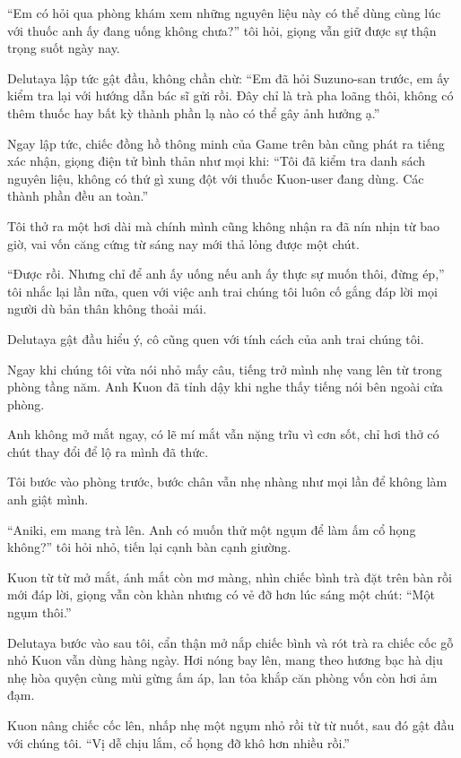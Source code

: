 \documentclass[../main.tex]{subfiles}
\begin{document}
``Em có hỏi qua phòng khám xem những nguyên liệu này có thể dùng cùng lúc với thuốc anh ấy đang uống không chưa?'' tôi hỏi, giọng vẫn giữ được sự thận trọng suốt ngày nay.

Delutaya lập tức gật đầu, không chần chừ: ``Em đã hỏi Suzuno-san trước, em ấy kiểm tra lại với hướng dẫn bác sĩ gửi rồi. Đây chỉ là trà pha loãng thôi, không có thêm thuốc hay bất kỳ thành phần lạ nào có thể gây ảnh hưởng ạ.''

Ngay lập tức, chiếc đồng hồ thông minh của Game trên bàn cũng phát ra tiếng xác nhận, giọng điện tử bình thản như mọi khi: ``Tôi đã kiểm tra danh sách nguyên liệu, không có thứ gì xung đột với thuốc Kuon-user đang dùng. Các thành phần đều an toàn.''

Tôi thở ra một hơi dài mà chính mình cũng không nhận ra đã nín nhịn từ bao giờ, vai vốn căng cứng từ sáng nay mới thả lỏng được một chút.

``Được rồi. Nhưng chỉ để anh ấy uống nếu anh ấy thực sự muốn thôi, đừng ép,'' tôi nhắc lại lần nữa, quen với việc anh trai chúng tôi luôn cố gắng đáp lời mọi người dù bản thân không thoải mái.

Delutaya gật đầu hiểu ý, cô cũng quen với tính cách của anh trai chúng tôi.

Ngay khi chúng tôi vừa nói nhỏ mấy câu, tiếng trở mình nhẹ vang lên từ trong phòng tầng năm. Anh Kuon đã tỉnh dậy khi nghe thấy tiếng nói bên ngoài cửa phòng.

Anh không mở mắt ngay, có lẽ mí mắt vẫn nặng trĩu vì cơn sốt, chỉ hơi thở có chút thay đổi để lộ ra mình đã thức.

Tôi bước vào phòng trước, bước chân vẫn nhẹ nhàng như mọi lần để không làm anh giật mình.

``Aniki, em mang trà lên. Anh có muốn thử một ngụm để làm ấm cổ họng không?'' tôi hỏi nhỏ, tiến lại cạnh bàn cạnh giường.

Kuon từ từ mở mắt, ánh mắt còn mơ màng, nhìn chiếc bình trà đặt trên bàn rồi mới đáp lời, giọng vẫn còn khàn nhưng có vẻ đỡ hơn lúc sáng một chút: ``Một ngụm thôi.''

Delutaya bước vào sau tôi, cẩn thận mở nắp chiếc bình và rót trà ra chiếc cốc gỗ nhỏ Kuon vẫn dùng hàng ngày. Hơi nóng bay lên, mang theo hương bạc hà dịu nhẹ hòa quyện cùng mùi gừng ấm áp, lan tỏa khắp căn phòng vốn còn hơi ảm đạm.

Kuon nâng chiếc cốc lên, nhấp nhẹ một ngụm nhỏ rồi từ từ nuốt, sau đó gật đầu với chúng tôi. ``Vị dễ chịu lắm, cổ họng đỡ khô hơn nhiều rồi.''
\end{document}
